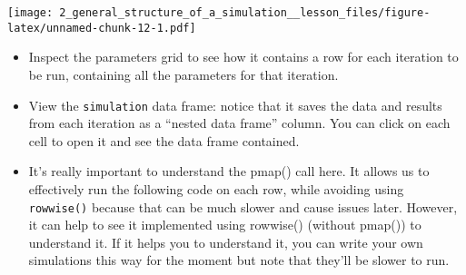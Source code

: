 \documentclass[
]{article}
\providecommand{\tightlist}{%
  \setlength{\itemsep}{0pt}\setlength{\parskip}{0pt}}
\begin{document}
\texttt{[image: 2\_general\_structure\_of\_a\_simulation\_\_lesson\_files/figure-latex/unnamed-chunk-12-1.pdf]}

\begin{itemize}
\tightlist
\item
  Inspect the parameters grid to see how it contains a row for each
  iteration to be run, containing all the parameters for that iteration.
\item
  View the \texttt{simulation} data frame: notice that it saves the data
  and results from each iteration as a ``nested data frame'' column. You
  can click on each cell to open it and see the data frame contained.
\item
  It's really important to understand the pmap() call here. It allows us
  to effectively run the following code on each row, while avoiding
  using \texttt{rowwise()} because that can be much slower and cause
  issues later. However, it can help to see it implemented using
  rowwise() (without pmap()) to understand it. If it helps you to
  understand it, you can write your own simulations this way for the
  moment but note that they'll be slower to run.
\end{itemize}
\end{document}
